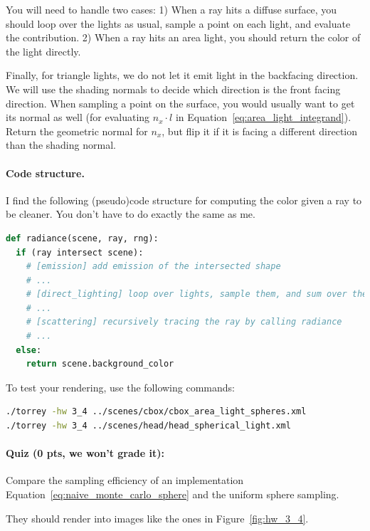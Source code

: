 You will need to handle two cases: 1) When a ray hits a diffuse surface, you should loop over the lights as usual, sample a point on each light, and evaluate the contribution. 2) When a ray hits an area light, you should return the color of the light directly.

Finally, for triangle lights, we do not let it emit light in the backfacing direction. We will use the shading normals to decide which direction is the front facing direction. When sampling a point on the surface, you would usually want to get its normal as well (for evaluating $n_x \cdot l$ in Equation~\eqref{eq:area_light_integrand}). Return the geometric normal for $n_x$, but flip it if it is facing a different direction than the shading normal.

\paragraph{Code structure.} I find the following (pseudo)code structure for computing the color given a ray to be cleaner. You don't have to do exactly the same as me.
\begin{lstlisting}[language=python]
def radiance(scene, ray, rng):
  if (ray intersect scene):
    # [emission] add emission of the intersected shape
    # ...
    # [direct_lighting] loop over lights, sample them, and sum over their contributions
    # ...
    # [scattering] recursively tracing the ray by calling radiance
    # ...
  else:
    return scene.background_color
\end{lstlisting}

To test your rendering, use the following commands:
\begin{lstlisting}[language=bash]
./torrey -hw 3_4 ../scenes/cbox/cbox_area_light_spheres.xml
./torrey -hw 3_4 ../scenes/head/head_spherical_light.xml
\end{lstlisting}

\paragraph{Quiz (0 pts, we won't grade it):} Compare the sampling efficiency of an implementation Equation~\eqref{eq:naive_monte_carlo_sphere} and the uniform sphere sampling.

They should render into images like the ones in Figure~\ref{fig:hw_3_4}. 

